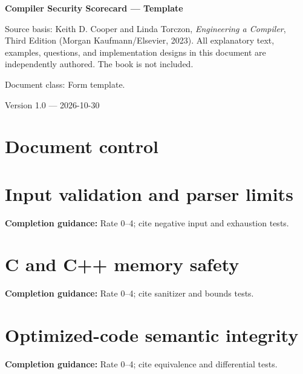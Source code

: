 \documentclass[10pt,letterpaper]{article}
\begin{document}
\hypersetup{pageanchor=false}%
\begin{titlepage}
\centering\vspace*{1.0in}
{\Huge\bfseries\textcolor{CompilerBlue}{Compiler Security Scorecard --- Template}\par}
\vspace{.22in}{\Large Authoring form and printable record\par}
\vspace{.4in}{\large Compiler Engineering Documentation Suite\par}
\vfill
\begin{minipage}{.86\linewidth}\small
Source basis: Keith D. Cooper and Linda Torczon, \emph{Engineering a Compiler}, Third Edition (Morgan Kaufmann/Elsevier, 2023). All explanatory text, examples, questions, and implementation designs in this document are independently authored. The book is not included.\par\medskip
Document class: Form template.
\end{minipage}
\vfill\textcolor{CompilerGray}{Version 1.0 --- 2026-10-30}\par
\end{titlepage}\hypersetup{pageanchor=true}
\tableofcontents\clearpage
\section{Document control}
\section{Input validation and parser limits}
\textbf{Completion guidance:} Rate 0--4; cite negative input and exhaustion tests.\par\medskip{}
\section{C and C++ memory safety}
\textbf{Completion guidance:} Rate 0--4; cite sanitizer and bounds tests.\par\medskip{}
\section{Optimized-code semantic integrity}
\textbf{Completion guidance:} Rate 0--4; cite equivalence and differential tests.\par\medskip{}
\end{document}
